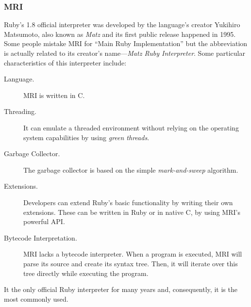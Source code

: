 \subsubsection{MRI}
Ruby's 1.8 official interpreter was developed by the language's creator Yukihiro Matsumoto, also known as \emph{Matz} and its first public release happened in 1995. Some people mistake MRI for ``Main Ruby Implementation'' but the abbreviation is actually related to its creator's name---\emph{Matz Ruby Interpreter}. Some particular characteristics of this interpreter include:
\begin{description}
\item[Language.] MRI is written in C.
\item[Threading.] It can emulate a threaded environment without relying on the operating system capabilities by using \textit{green threads}.
\item[Garbage Collector.] The garbage collector is based on the simple \textit{mark-and-sweep} algorithm.
\item[Extensions.]  Developers can extend Ruby's basic functionality by writing their own extensions. These can be written in Ruby or in native C, by using MRI's powerful API.
\item[Bytecode Interpretation.] MRI lacks a bytecode interpreter. When a program is executed, MRI will parse its source and create its syntax tree. Then, it will iterate over this tree directly while executing the program.
\end{description}
It the only official Ruby interpreter for many years and, consequently, it is the most commonly used.


